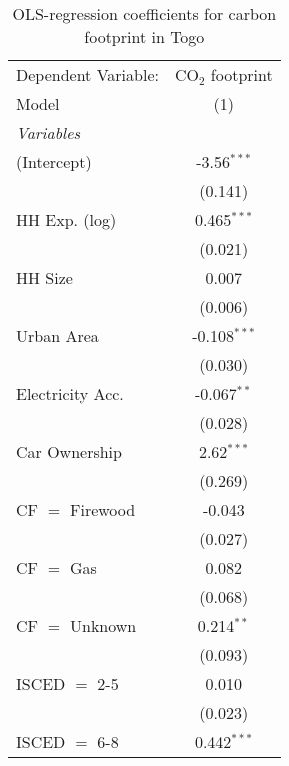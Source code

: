 
\begin{table}[htbp!]
   \centering
   \small
   \begin{adjustbox}{width = 1\textwidth, max height = 0.95\textheight, center}
      \begin{threeparttable}[b]
         \caption{\label{tab:OLS_2_TGO} OLS-regression coefficients for carbon footprint in Togo}
         \begin{tabular}{lc}
            \tabularnewline \midrule \midrule
            Dependent Variable: & CO$_{2}$ footprint\\  
            Model               & (1)\\  
            \midrule
            \emph{Variables}\\
            (Intercept)         & -3.56$^{***}$\\   
                                & (0.141)\\   
            HH Exp. (log)       & 0.465$^{***}$\\   
                                & (0.021)\\   
            HH Size             & 0.007\\   
                                & (0.006)\\   
            Urban Area          & -0.108$^{***}$\\   
                                & (0.030)\\   
            Electricity Acc.    & -0.067$^{**}$\\   
                                & (0.028)\\   
            Car Ownership       & 2.62$^{***}$\\   
                                & (0.269)\\   
            CF $=$ Firewood     & -0.043\\   
                                & (0.027)\\   
            CF $=$ Gas          & 0.082\\   
                                & (0.068)\\   
            CF $=$ Unknown      & 0.214$^{**}$\\   
                                & (0.093)\\   
            ISCED $=$ 2-5       & 0.010\\   
                                & (0.023)\\   
            ISCED $=$ 6-8       & 0.442$^{***}$\\   

\end{tabular}
\end{threeparttable}
\end{adjustbox}
\end{table}
